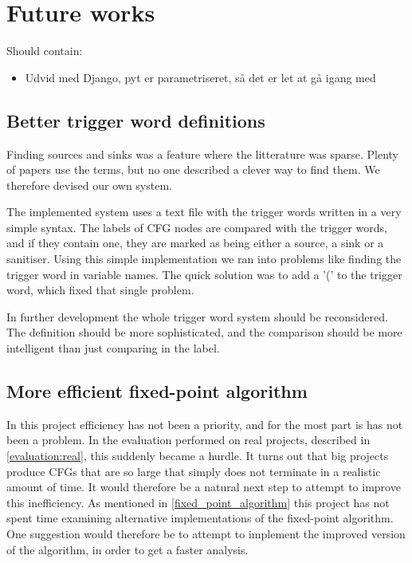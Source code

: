 \section{Future works}

Should contain:
\begin{itemize}
\item Udvid med Django, pyt er parametriseret, så det er let at gå igang med
\end{itemize}

\subsection{Better trigger word definitions}
Finding sources and sinks was a feature where the litterature was sparse.
Plenty of papers use the terms, but no one described a clever way to find them.
We therefore devised our own system.

The implemented system uses a text file with the trigger words written in a very simple syntax.
The labels of CFG nodes are compared with the trigger words, and if they contain one, they are marked as being either a source, a sink or a sanitiser.
Using this simple implementation we ran into problems like finding the trigger word in variable names.
The quick solution was to add a '(' to the trigger word, which fixed that single problem.

In further development the whole trigger word system should be reconsidered.
The definition should be more sophisticated, and the comparison should be more intelligent than just comparing in the label.

\subsection{More efficient fixed-point algorithm}
In this project efficiency has not been a priority, and for the most part is has not been a problem.
In the evaluation performed on real projects, described in \cref{evaluation:real}, this suddenly became a hurdle.
It turns out that big projects produce CFGs that are so large that \pyt{} simply does not terminate in a realistic amount of time.
It would therefore be a natural next step to attempt to improve this inefficiency.
As mentioned in \cref{fixed_point_algorithm} this project has not spent time examining alternative implementations of the fixed-point algorithm.
One suggestion would therefore be to attempt to implement the improved version of the algorithm, in order to get a faster analysis.


